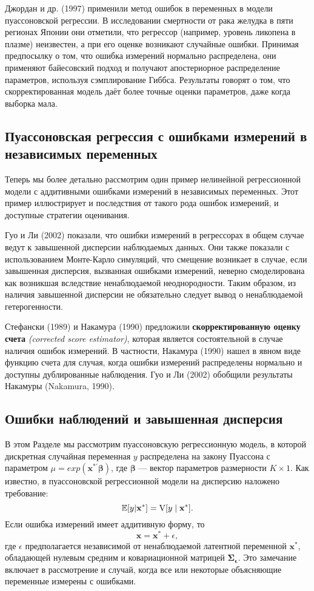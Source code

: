 Джордан и др. (1997) применили метод ошибок в переменных в модели пуассоновской регрессии. В исследовании смертности от рака желудка в пяти регионах Японии они отметили, что регрессор (например, уровень ликопена в плазме) неизвестен, а при его оценке возникают случайные ошибки. Принимая предпосылку о том, что ошибка измерений нормально распределена, они применяют байесовский подход и получают апостериорное распределение параметров, используя сэмплирование Гиббса. Результаты говорят о том, что скорректированная модель даёт более точные оценки параметров, даже когда выборка мала.

\subsection{Пуассоновская регрессия с ошибками измерений в независимых переменных} 
Теперь мы более детально рассмотрим один  пример нелинейной регрессионной модели с аддитивными ошибками измерений в независимых переменных. Этот пример иллюстрирует и последствия от такого рода ошибок измерений, и доступные стратегии оценивания.

Гуо и Ли (2002) показали, что ошибки измерений в регрессорах в общем случае ведут к завышенной дисперсии наблюдаемых данных. Они также показали с использованием Монте-Карло симуляций, что смещение возникает в случае, если завышенная дисперсия, вызванная ошибками измерений, неверно смоделирована как возникшая вследствие ненаблюдаемой неоднородности. Таким образом, из наличия завышенной дисперсии не обязательно следует вывод о ненаблюдаемой гетерогенности.

Стефански (1989) и Накамура (1990) предложили {\bf скорректированную оценку счета} \emph{(corrected score estimator)}, которая является состоятельной в случае наличия ошибок измерений. В частности, Накамура (1990) нашел в явном виде функцию счета для случая, когда ошибки измерений распределены нормально и доступны дублированные наблюдения. Гуо и Ли (2002) обобщили результаты Накамуры (Nakamura, 1990).

\subsection*{Ошибки наблюдений и завышенная дисперсия} 
В этом Разделе мы рассмотрим пуассоновскую регрессионную модель, в которой дискретная случайная переменная $y$ распределена на закону Пуассона с параметром $\mu = exp(\mathbf{x^{*\prime} \beta})$, где $\mathbf{\beta}$ --- вектор параметров размерности $K \times 1$. Как известно, в пуассоновской регрессионной модели  на дисперсию наложено требование:
\begin{equation}
\mathbb{E}[y| \mathbf{x^*}]=\mathrm{V}[y \mid  \mathbf{x^*}].
\end{equation} 
Если ошибка измерений имеет аддитивную форму, то
\[
\mathbf{x}=\mathbf{x^*}+ \epsilon,
\]
где $\epsilon$ предполагается независимой от ненаблюдаемой латентной переменной $\mathbf{x^*}$, обладающей нулевым средним и ковариационной матрицей $\mathbf{\Sigma_{\epsilon}}$. Это замечание включает в рассмотрение и случай, когда все или некоторые объясняющие переменные измерены с ошибками.

